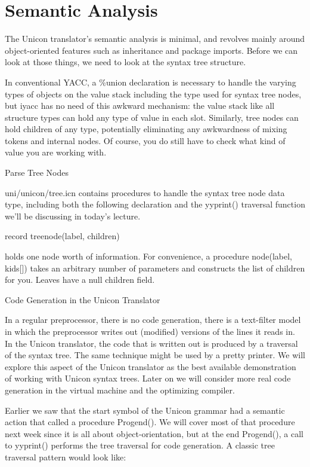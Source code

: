 \section{Semantic Analysis}

The Unicon translator's semantic analysis is minimal, and revolves
mainly around object-oriented features such as inheritance and package
imports. Before we can look at those things, we need to look at the
syntax tree structure.

In conventional YACC, a \%union declaration is necessary to handle the
varying types of objects on the value stack including the type used
for syntax tree nodes, but iyacc has no need of this awkward
mechanism: the value stack like all structure types can hold any type
of value in each slot. Similarly, tree nodes can hold children of any
type, potentially eliminating any awkwardness of mixing tokens and
internal nodes. Of course, you do still have to check what kind of
value you are working with.

{\sffamily
Parse Tree Nodes }

uni/unicon/tree.icn contains procedures to handle the syntax tree node
data type, including both the following declaration and the yyprint()
traversal function we'll be discussing in today's lecture.

{\ttfamily\mdseries
record treenode(label, children)}

\noindent holds one node worth of information. For convenience, a
procedure node(label, kids[]) takes an arbitrary number of parameters
and constructs the list of children for you. Leaves have a null
children field.

{\sffamily
{\textquotedbl}Code Generation{\textquotedbl} in the Unicon Translator }

In a regular preprocessor, there is no code generation, there is a
text-filter model in which the preprocessor writes out (modified)
versions of the lines it reads in. In the Unicon translator, the code
that is written out is produced by a traversal of the syntax tree. The
same technique might be used by a {\textquotedbl}pretty
printer{\textquotedbl}. We will explore this aspect of the Unicon
translator as the best available demonstration of working with Unicon
syntax trees. Later on we will consider more
{\textquotedbl}real{\textquotedbl} code generation in the virtual
machine and the optimizing compiler.

Earlier we saw that the start symbol of the Unicon grammar had a
semantic action that called a procedure Progend(). We will cover most
of that procedure next week since it is all about object-orientation,
but at the end Progend(), a call to yyprint() performs the tree
traversal for code generation. A classic tree traversal pattern would
look like:

